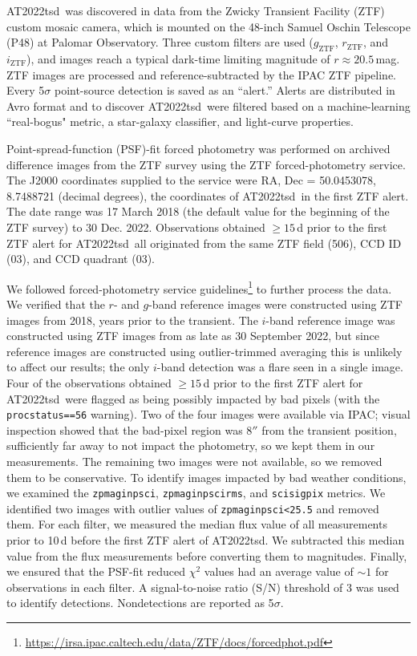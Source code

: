 \documentclass{nature_plusfigure}
\newcommand{\at}{AT2022tsd}
\begin{document}
\begin{methods}
\at\ was discovered in data from the Zwicky Transient Facility (ZTF\cite{Graham2019,Bellm2019}) custom mosaic camera\cite{Dekany2020}, which is mounted on the 48-inch Samuel Oschin Telescope (P48) at Palomar Observatory.
Three custom filters are used ($g_{\mathrm{ZTF}}$, $r_{\mathrm{ZTF}}$, and $i_{\mathrm{ZTF}}$\cite{Dekany2020}),
and images reach a typical dark-time limiting magnitude of $r\approx20.5\,$mag.
ZTF images are processed and reference-subtracted\cite{Zackay2016}
by the IPAC ZTF pipeline\cite{Masci2019}.
Every 5$\sigma$ point-source detection is saved as an ``alert.''
Alerts are distributed in Avro format\cite{Patterson2019} and to discover \at\ were filtered based on a machine-learning ``real-bogus" metric\cite{Duev2019}, a star-galaxy classifier\cite{Tachibana2018}, and light-curve properties.

Point-spread-function (PSF)-fit forced photometry was performed on archived difference images from the ZTF survey using the ZTF forced-photometry service\cite{Masci2019}. The J2000 coordinates supplied to the service were RA, Dec = 50.0453078, 8.7488721 (decimal degrees), the coordinates of \at\ in the first ZTF alert. The date range was 17 March 2018 (the default value for the beginning of the ZTF survey) to 30 Dec. 2022.
Observations obtained $\geq 15$\,d prior to the first ZTF alert for \at\ all originated from the same ZTF field (506), CCD ID (03), and CCD quadrant (03). 

We followed forced-photometry service guidelines\footnote{\url{https://irsa.ipac.caltech.edu/data/ZTF/docs/forcedphot.pdf}} to further process the data.
We verified that the $r$- and $g$-band reference images were constructed using ZTF images from 2018, years prior to the transient. The $i$-band reference image was constructed using ZTF images from as late as 30 September 2022, but since reference images are constructed using outlier-trimmed averaging\cite{Masci2019} this is unlikely to affect our results; the only $i$-band detection was a flare seen in a single image. 
Four of the observations obtained $\geq 15$\,d prior to the first ZTF alert for \at\ were flagged as being possibly impacted by bad pixels (with the \texttt{procstatus==56} warning).
Two of the four images were available via IPAC; visual inspection showed that the bad-pixel region was 8$''$ from the transient position, sufficiently far away to not impact the photometry, so we kept them in our measurements.
The remaining two images were not available, so we removed them to be conservative.
To identify images impacted by bad weather conditions, we examined the \texttt{zpmaginpsci}, \texttt{zpmaginpscirms}, and \texttt{scisigpix} metrics. We identified two images with outlier values of \texttt{zpmaginpsci<25.5} and removed them.
For each filter, we measured the median flux value of all measurements prior to 10\,d before the first ZTF alert of \at. We subtracted this median value from the flux measurements before converting them to magnitudes.
Finally, we ensured that the PSF-fit reduced $\chi^2$ values had an average value of $\sim 1$ for observations in each filter.
A signal-to-noise ratio (S/N) threshold of 3 was used to identify detections. Nondetections are reported as 5$\sigma$.


\end{methods}
\end{document}
